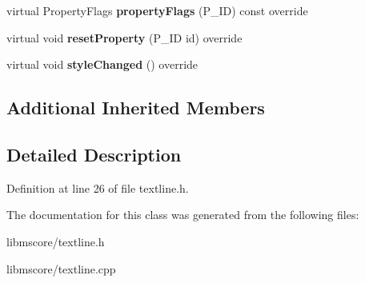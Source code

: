 \begin{DoxyCompactItemize}
\mbox{\label{class_ms_1_1_text_line_segment_aa3d1f5a8e343966ee489addccc87b74a}} 
virtual Property\+Flags {\bfseries property\+Flags} (P\+\_\+\+ID) const override
\item 
\mbox{\label{class_ms_1_1_text_line_segment_a1dcd20c434a4aff91b6a888dc541802f}} 
virtual void {\bfseries reset\+Property} (P\+\_\+\+ID id) override
\item 
\mbox{\label{class_ms_1_1_text_line_segment_ac576d3f81b2ffe3e971d5e65dffa99ad}} 
virtual void {\bfseries style\+Changed} () override
\end{DoxyCompactItemize}
\subsection*{Additional Inherited Members}


\subsection{Detailed Description}


Definition at line 26 of file textline.\+h.



The documentation for this class was generated from the following files\+:\begin{DoxyCompactItemize}
\item 
libmscore/textline.\+h\item 
libmscore/textline.\+cpp\end{DoxyCompactItemize}
